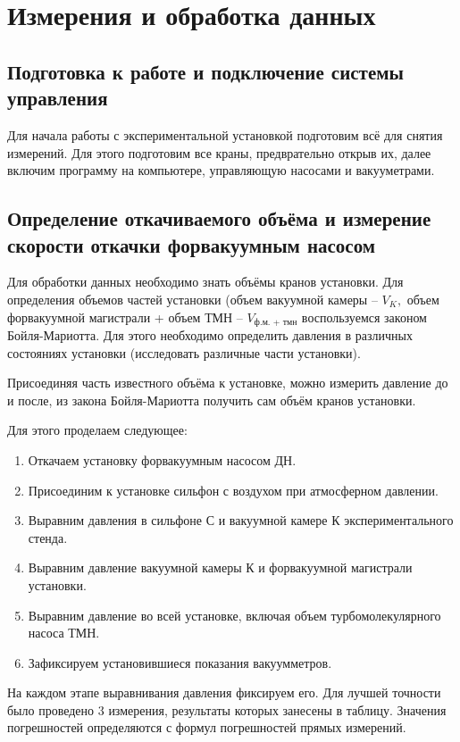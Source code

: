 \documentclass[a4paper, 12pt]{article} %
\begin{document}
\section{Измерения и обработка данных}
\subsection{Подготовка к работе и подключение системы управления}

Для начала работы с экспериментальной установкой подготовим всё для снятия измерений. Для этого подготовим все краны, предврательно открыв их, далее включим программу на компьютере, управляющую насосами и вакууметрами. 

\subsection{Определение откачиваемого объёма и измерение скорости откачки форвакуумным насосом}

Для обработки данных необходимо знать объёмы кранов установки. 
Для определения объемов частей установки (объем вакуумной камеры -- $V_{K},$  объем форвакуумной магистрали + объем ТМН -- $V_{\text{ф.м. + тмн}}$ воспользуемся законом Бойля-Мариотта. Для этого необходимо определить давления в различных состояниях установки (исследовать различные части установки).

Присоединяя часть известного объёма к установке, можно измерить давление до и после, из закона Бойля-Мариотта получить сам объём кранов установки.

Для этого проделаем следующее:
\begin{enumerate}
	\item Откачаем установку форвакуумным насосом ДН.
	\item Присоединим к установке сильфон с воздухом при атмосферном давлении.
	\item Выравним давления в сильфоне С и вакуумной камере К экспериментального стенда.
	\item Выравним давление вакуумной камеры К и форвакуумной магистрали установки.
	\item Выравним давление во всей установке, включая объем турбомолекулярного насоса ТМН.
	\item Зафиксируем установившиеся показания вакуумметров.
	
\end{enumerate}
	
На каждом этапе выравнивания давления фиксируем его. Для лучшей точности было проведено 3 измерения, результаты которых занесены в таблицу. Значения погрешностей определяются с формул погрешностей прямых измерений.
\end{document}
